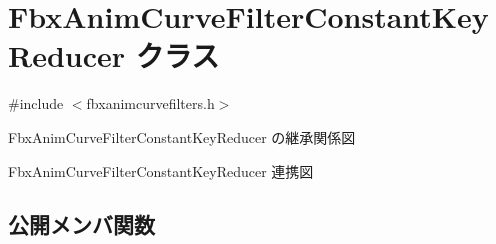 \hypertarget{class_fbx_anim_curve_filter_constant_key_reducer}{}\section{Fbx\+Anim\+Curve\+Filter\+Constant\+Key\+Reducer クラス}
\label{class_fbx_anim_curve_filter_constant_key_reducer}


{\ttfamily \#include $<$fbxanimcurvefilters.\+h$>$}



Fbx\+Anim\+Curve\+Filter\+Constant\+Key\+Reducer の継承関係図


Fbx\+Anim\+Curve\+Filter\+Constant\+Key\+Reducer 連携図
\subsection*{公開メンバ関数}
